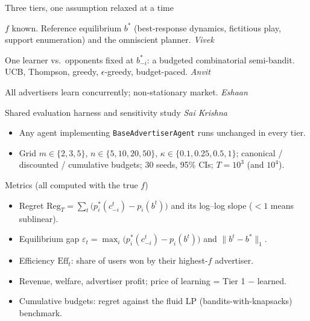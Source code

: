 \documentclass[aspectratio=169,11pt]{beamer}
\newcommand{\Reg}{\mathrm{Reg}}
\begin{document}
\begin{frame}{Three tiers, one assumption relaxed at a time}
  \begin{description}[Tier 3]
    \item[Tier 1] $f$ known. Reference equilibrium $b^*$ (best-response dynamics, fictitious play,
          support enumeration) and the omniscient planner. \hfill\emph{Vivek}
    \item[Tier 2] One learner vs.\ opponents fixed at $b^*_{-i}$: a budgeted combinatorial
          semi-bandit. UCB, Thompson, greedy, $\epsilon$-greedy, budget-paced. \hfill\emph{Anvit}
    \item[Tier 3] All advertisers learn concurrently; non-stationary market. \hfill\emph{Eshaan}
  \end{description}
  \vspace{0.6em}
  Shared evaluation harness and sensitivity study \hfill\emph{Sai Krishna}
  \begin{itemize}
    \item Any agent implementing \texttt{BaseAdvertiserAgent} runs unchanged in every tier.
    \item Grid $m\in\{2,3,5\}$, $n\in\{5,10,20,50\}$, $\kappa\in\{0.1,0.25,0.5,1\}$;
          canonical / discounted / cumulative budgets; 30 seeds, 95\% CIs; $T=10^3$ (and $10^4$).
  \end{itemize}
\end{frame}

\begin{frame}{Metrics (all computed with the true $f$)}
  \begin{itemize}
    \item Regret $\Reg_T=\sum_t\big(p_i^*(c^t_{-i})-p_i(b^t)\big)$ and its log--log slope
          ($<1$ means sublinear).
    \item Equilibrium gap $\varepsilon_t=\max_i\big(p_i^*(c^t_{-i})-p_i(b^t)\big)$ and
          $\|b^t-b^*\|_1$.
    \item Efficiency $\mathrm{Eff}_t$: share of users won by their highest-$f$ advertiser.
    \item Revenue, welfare, advertiser profit; price of learning = Tier 1 $-$ learned.
    \item Cumulative budgets: regret against the fluid LP (bandits-with-knapsacks) benchmark.
  \end{itemize}
\end{frame}
\end{document}
